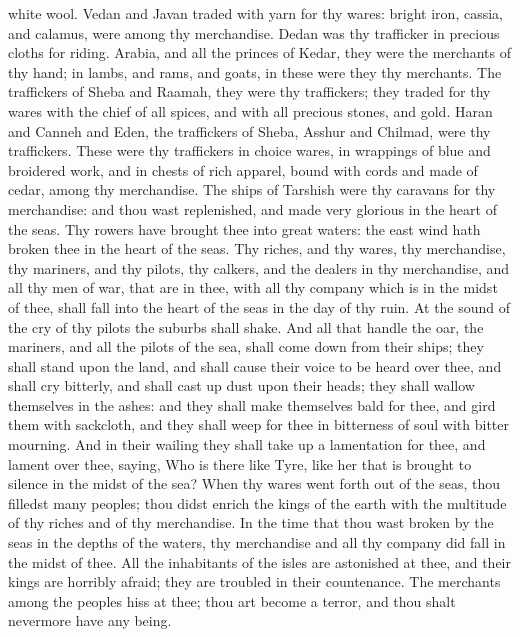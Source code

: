 white wool. Vedan and Javan traded with yarn for thy wares: bright iron, cassia, and calamus, were among thy merchandise. Dedan was thy trafficker in precious cloths for riding. Arabia, and all the princes of Kedar, they were the merchants of thy hand; in lambs, and rams, and goats, in these were they thy merchants. The traffickers of Sheba and Raamah, they were thy traffickers; they traded for thy wares with the chief of all spices, and with all precious stones, and gold. Haran and Canneh and Eden, the traffickers of Sheba, Asshur and Chilmad, were thy traffickers. These were thy traffickers in choice wares, in wrappings of blue and broidered work, and in chests of rich apparel, bound with cords and made of cedar, among thy merchandise. The ships of Tarshish were thy caravans for thy merchandise: and thou wast replenished, and made very glorious in the heart of the seas.  Thy rowers have brought thee into great waters: the east wind hath broken thee in the heart of the seas. Thy riches, and thy wares, thy merchandise, thy mariners, and thy pilots, thy calkers, and the dealers in thy merchandise, and all thy men of war, that are in thee, with all thy company which is in the midst of thee, shall fall into the heart of the seas in the day of thy ruin. At the sound of the cry of thy pilots the suburbs shall shake. And all that handle the oar, the mariners, and all the pilots of the sea, shall come down from their ships; they shall stand upon the land, and shall cause their voice to be heard over thee, and shall cry bitterly, and shall cast up dust upon their heads; they shall wallow themselves in the ashes: and they shall make themselves bald for thee, and gird them with sackcloth, and they shall weep for thee in bitterness of soul with bitter mourning. And in their wailing they shall take up a lamentation for thee, and lament over thee, saying, Who is there like Tyre, like her that is brought to silence in the midst of the sea? When thy wares went forth out of the seas, thou filledst many peoples; thou didst enrich the kings of the earth with the multitude of thy riches and of thy merchandise. In the time that thou wast broken by the seas in the depths of the waters, thy merchandise and all thy company did fall in the midst of thee. All the inhabitants of the isles are astonished at thee, and their kings are horribly afraid; they are troubled in their countenance. The merchants among the peoples hiss at thee; thou art become a terror, and thou shalt nevermore have any being. 

